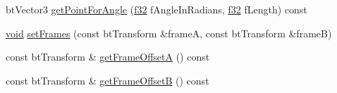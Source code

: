 \begin{DoxyCompactItemize}
\item 
bt\+Vector3 \mbox{\hyperlink{classnjli_1_1_physics_constraint_cone_twist_a3df16444695d8a3d406a7efe742106fb}{get\+Point\+For\+Angle}} (\mbox{\hyperlink{_util_8h_a5f6906312a689f27d70e9d086649d3fd}{f32}} f\+Angle\+In\+Radians, \mbox{\hyperlink{_util_8h_a5f6906312a689f27d70e9d086649d3fd}{f32}} f\+Length) const
\item 
\mbox{\hyperlink{_thread_8h_af1e856da2e658414cb2456cb6f7ebc66}{void}} \mbox{\hyperlink{classnjli_1_1_physics_constraint_cone_twist_a8bbcee31a07d672830c0079e8559fde4}{set\+Frames}} (const bt\+Transform \&frameA, const bt\+Transform \&frameB)
\item 
const bt\+Transform \& \mbox{\hyperlink{classnjli_1_1_physics_constraint_cone_twist_af59e5ea018cd7346aa8cbb63ba54e9e6}{get\+Frame\+OffsetA}} () const
\item 
const bt\+Transform \& \mbox{\hyperlink{classnjli_1_1_physics_constraint_cone_twist_a4e7b8678b101ddc4e0ead4d12a9e802e}{get\+Frame\+OffsetB}} () const
\end{DoxyCompactItemize}
